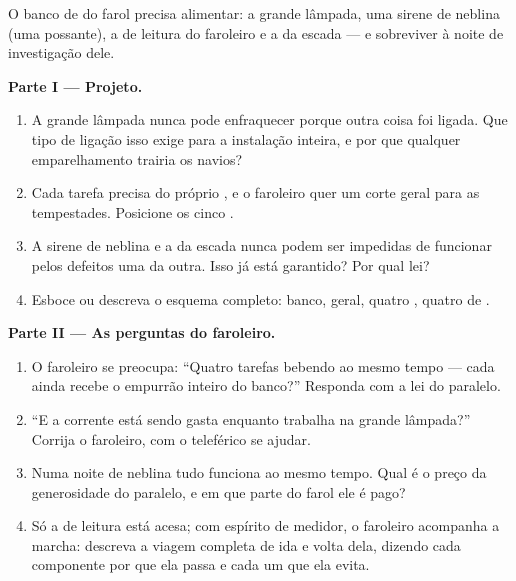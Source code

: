 \begin{problem}\label{pb:g7:circuits-series-parallel:1}
O banco de  do farol precisa alimentar: a grande lâmpada, uma
sirene de neblina (uma  possante), a  de leitura do
faroleiro e a  da escada --- e sobreviver à noite de investigação
dele.

\medskip\noindent\textbf{Parte I --- Projeto.}
\begin{enumerate}
  \item A grande lâmpada nunca pode enfraquecer porque outra coisa
        foi ligada. Que tipo de ligação isso exige para a instalação
        inteira, e por que qualquer emparelhamento  trairia
        os navios?
  \item Cada tarefa precisa do próprio , e o faroleiro
        quer um corte geral para as tempestades. Posicione os cinco
        .
  \item A sirene de neblina e a  da escada nunca podem ser
        impedidas de funcionar pelos defeitos uma da outra. Isso já
        está garantido? Por qual lei?
  \item Esboce ou descreva o esquema completo: banco, 
        geral, quatro , quatro  de .
\end{enumerate}

\medskip\noindent\textbf{Parte II --- As perguntas do faroleiro.}
\begin{enumerate}[resume]
  \item O faroleiro se preocupa: ``Quatro tarefas bebendo ao mesmo
        tempo --- cada  ainda recebe o empurrão inteiro do
        banco?'' Responda com a lei do paralelo.
  \item ``E a corrente está sendo gasta enquanto trabalha na grande
        lâmpada?'' Corrija o faroleiro, com o teleférico se ajudar.
  \item Numa noite de neblina tudo funciona ao mesmo tempo. Qual é o
        preço da generosidade do paralelo, e em que parte do farol
        ele é pago?
  \item Só a  de leitura está acesa; com espírito de medidor, o
        faroleiro acompanha a marcha: descreva a viagem completa de
        ida e volta dela, dizendo cada componente por que ela passa e
        cada um que ela evita.
\end{enumerate}


\end{problem}
